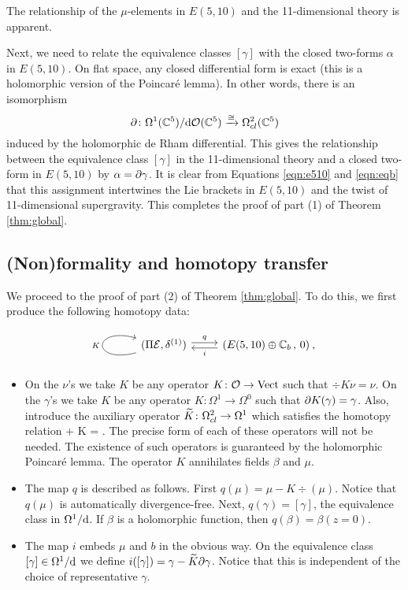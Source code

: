 The relationship of the $\mu$-elements in $E(5,10)$ and the 11-dimensional theory is apparent.

Next, we need to relate the equivalence classes $[\gamma]$ with the closed two-forms $\alpha$ in $E(5,10)$. 
On flat space, any closed differential form is exact (this is a holomorphic version of the Poincar\'e lemma). 
In other words, there is an isomorphism
\[
\partial \colon \Omega^1 (\mathbb C^5) / {\rm d} \mathcal O(\mathbb C^5) \xrightarrow{\cong} \Omega^{2}_{cl}(\mathbb C^5)
\]
induced by the holomorphic de Rham differential.
This gives the relationship between the equivalence class $[\gamma]$ in the 11-dimensional theory and a closed two-form in $E(5,10)$ by $\alpha = \partial \gamma$. 
It is clear from Equations \eqref{eqn:e510} and \eqref{eqn:eqb} that this assignment intertwines the Lie brackets in $E(5,10)$ and the twist of 11-dimensional supergravity. 
This completes the proof of part (1) of Theorem \ref{thm:global}.

\subsection{(Non)formality and homotopy transfer} 
\label{s:ht}
We proceed to the proof of part (2) of Theorem \ref{thm:global}. 
To do this, we first produce the following homotopy data:
\begin{equation}
\begin{tikzcd}
\arrow[loop left]{l}{K}(\Pi \cE , \delta^{(1)})\arrow[r, shift left, "q"] &(E(5,10) \oplus \CC_b \, , \, 0)\arrow[l, shift left, "i"] \: ,
\end{tikzcd}
\end{equation}

\begin{itemize}
\item On the $\nu$'s we take $K$ be any operator $K \colon \mathcal O \to {\rm Vect}$ such that $\div K \nu = \nu$. 
On the $\gamma$'s we take $K$ be any operator $K \colon \Omega^1 \to \Omega^0$ such that $\partial K(\gamma) = \gamma$. 
Also, introduce the auxiliary operator $\widetilde{K} \colon \Omega^2_{cl} \to \Omega^1$ which satisfies the homotopy relation
\beqn\label{eqn:htpy1}
 \del \gamma + \del K \gamma = \gamma . 
\eeqn
The precise form of each of these operators will not be needed.
The existence of such operators is guaranteed by the holomorphic Poincar\'e lemma.
The operator $K$ annihilates fields $\beta$ and $\mu$. 
\item 
The map $q$ is described as follows. 
First $q(\mu) = \mu - K \div (\mu)$.
Notice that $q(\mu)$ is automatically divergence-free.
Next, $q(\gamma) = [\gamma]$, the equivalence class in $\Omega^1 / {\rm d}$. 
If $\beta$ is a holomorphic function, then $q(\beta) = \beta (z=0)$.
\item 
The map $i$ embeds $\mu$ and $b$ in the obvious way.
On the equivalence class $[\gamma] \in \Omega^1 / {\rm d}$ we define $i([\gamma]) = \gamma - \widetilde{K} \partial \gamma$. 
Notice that this is independent of the choice of representative $\gamma$. 
\end{itemize}

